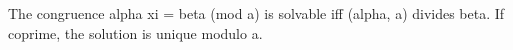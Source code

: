 The congruence alpha xi = beta (mod a) is solvable iff (alpha, a) divides beta. If coprime, the solution is unique modulo a.
